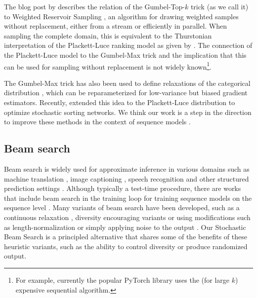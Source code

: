 The blog post by \citet{vieira2014gumbel} describes the relation of the Gumbel-Top-$k$ trick (as we call it) to Weighted Reservoir Sampling \citep{efraimidis2006weighted},  an algorithm for drawing weighted samples without replacement, either from a stream or efficiently in parallel. When sampling the complete domain, this is equivalent to the Thurstonian \citep{thurstone1927} interpretation of the Plackett-Luce ranking model \citep{plackett1975analysis,luce1959individual} as given by \citet{yellott1977relationship}. The connection of the Plackett-Luce model to the Gumbel-Max trick and the implication that this can be used for sampling without replacement is not widely known\footnote{For example, currently the popular PyTorch \citep{paszke2017automatic} library uses the (for large $k$) expensive sequential algorithm.}.

The Gumbel-Max trick has also been used to define relaxations of the categorical distribution \citep{maddison2016concrete, jang2016categorical}, which can be reparameterized for low-variance but biased gradient estimators. Recently, \citet{grover2018stochastic} extended this idea to the Plackett-Luce distribution to optimize stochastic sorting networks. We think our work is a step in the direction to improve these methods in the context of sequence models \citep{gu2017neural}.

\subsection{Beam search}
Beam search is widely used for approximate inference in various domains such as machine translation \citep{sutskever2014sequence,bahdanau2014neural,ranzato2016sequence,vaswani2017attention,gehring2017convolutional}, image captioning \citep{vinyals2015show}, speech recognition \citep{graves2013speech} and other structured prediction settings \citep{vinyals2015pointer,weiss2015structured}. Although typically a test-time procedure, there are works that include beam search in the training loop \citep{daume2009search,wiseman2016sequence,edunov2018classical,negrinho2018learning,edunov2018understanding} for training sequence models on the sequence level \citep{ranzato2016sequence,bahdanau2017actor}.
Many variants of beam search have been developed, such as a continuous relaxation \citep{goyal18continuous}, diversity encouraging variants \citep{li2016simple,shao2017generating,vijayakumar2018diverse} or using modifications such as length-normalization \citep{wu2016google} or simply applying noise to the output \citep{edunov2018understanding}.
Our Stochastic Beam Search is a principled alternative that shares some of the benefits of these heuristic variants, such as the ability to control diversity or produce randomized output.


